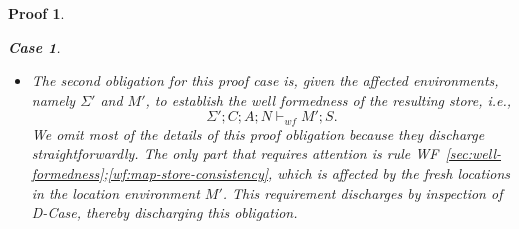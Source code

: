 \documentclass[showabstract,showacknowledgments,showpreface,showdedication,school]{iuphd}
\newtheorem*{bcase}{Case}
\theoremstyle{nonumberplain}
\newtheorem{nproof}{Proof}
\newcommand{\keywd}[1]{\mathit{#1}}
\newcommand{\skeywd}[1]{\mathit{#1}}
\newcommand{\EXPR}{\keywd{e}}
\newcommand{\TYP}{\keywd{\tau}}
\newcommand{\hTYP}{\keywd{\hat{\tau}}}
\newcommand{\var}{\svar}
\newcommand{\svar}{x}
\newcommand{\loc}{\skeywd{l}}
\newcommand{\concreteloc}[3]{\ensuremath{\langle #1, #2 \rangle ^{#3}}}
\newcommand{\reg}{\skeywd{r}}
\newcommand{\STOR}{\keywd{S}}
\newcommand{\CENV}{\keywd{C}}
\newcommand{\SENV}{\keywd{\Sigma}}
\newcommand{\MENV}{\keywd{M}}
\newcommand{\AENV}{\keywd{A}}
\newcommand{\NENV}{\keywd{N}}
\newcommand{\locreg}[2]{\ensuremath{{#1}^{#2}}}
\newcommand{\subst}[3]{\ensuremath{#1[#3/#2]}}
\newcommand{\storewf}[6]{\ensuremath{#1;#2;#3;#4 \vdash_{wf} #5;#6}}
\newcommand{\refwellformed}[2]{WF~\ref{#1};\ref{#2}}
\newcommand{\dcase}{D-Case}
\newcommand{\overharpoon}[1]{\overrightharpoon{#1}}
\begin{document}
\begin{nproof}
\begin{bcase}
\begin{itemize}
    to show that, for each such $i$, $(\locreg{\overharpoon{\loc_i}}{\reg} \mapsto \overharpoon{\TYP_i}) \in \SENV'$,
    which is immediate by inspection on $\SENV'$ above.
    Third, and finally, to establish the typing judgement for $\EXPR'$, we use the Substitution
    Lemma \ref{lemma:substitution}, which yields
    \begin{align*}
    \emptyset;\SENV';\CENV;\AENV;\NENV \vdash \AENV;\NENV; \subst{\EXPR}{\overharpoon{\var_1}}{\concreteloc{\reg}{\overharpoon{w_1}}{\overharpoon{\locreg{\loc_1}{\reg}}}}
    \ldots \subst{}{\overharpoon{\var_n}}{\concreteloc{\reg}{\overharpoon{w_1}}{\overharpoon{\locreg{\loc_n}{\reg}}}}: \hTYP,
    \end{align*}
    as needed, thereby discharging this obligation.
    \item The second obligation
    for this proof case is, given the affected environments, namely
    $\SENV'$ and $\MENV'$, to establish the well formedness
    of the resulting store, i.e.,
    \begin{displaymath}
    \storewf{\SENV'}{\CENV}{\AENV}{\NENV}{\MENV'}{\STOR}.
    \end{displaymath}
    We omit most of the details of this proof obligation because they
    discharge straightforwardly.
    The only part that requires attention is rule
    \refwellformed{sec:well-formedness}{wf:map-store-consistency},
    which is affected by the fresh locations in the location
    environment $\MENV'$.
    This requirement discharges by inspection of \dcase{}, thereby
    discharging this obligation.
    \end{itemize}
  \end{bcase}


\end{nproof}
\end{document}
